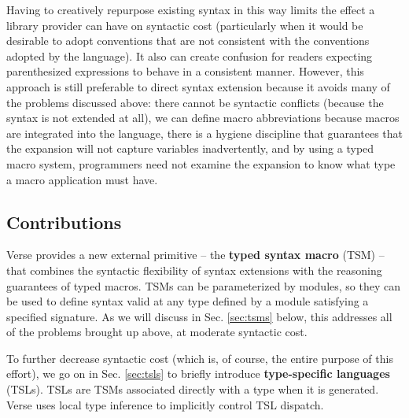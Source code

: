 Having to creatively repurpose existing syntax in this way limits the effect a library provider can have on syntactic cost (particularly when it would be desirable to adopt conventions that are not consistent with the conventions adopted by the language). It also can create confusion for readers expecting parenthesized expressions to behave in a consistent manner. However,  this approach is still preferable to direct syntax extension because it avoids many of the problems discussed above: there cannot be syntactic conflicts (because the syntax is not extended at all), we can define macro abbreviations because macros are integrated into the language, there is a hygiene discipline that guarantees that the expansion will not capture variables inadvertently, and by using a typed macro system, programmers need not examine the expansion to know what type a macro application must have. 


\subsection{Contributions}\label{sec:syntax-contributions}
Verse provides a new external primitive -- the \textbf{typed syntax macro} (TSM) -- that combines the syntactic flexibility of syntax extensions with the reasoning guarantees of typed macros. TSMs can be parameterized by modules, so they can be used to define syntax valid at any type defined by a module satisfying a specified signature. As we will discuss in Sec. \ref{sec:tsms} below, this addresses all of the problems brought up above, at moderate syntactic cost.

To further decrease syntactic cost (which is, of course, the entire purpose of this effort), we go on in Sec. \ref{sec:tsls} to briefly introduce \textbf{type-specific languages} (TSLs). TSLs are TSMs associated directly with a type when it is generated. Verse uses local type inference to implicitly control TSL dispatch.

